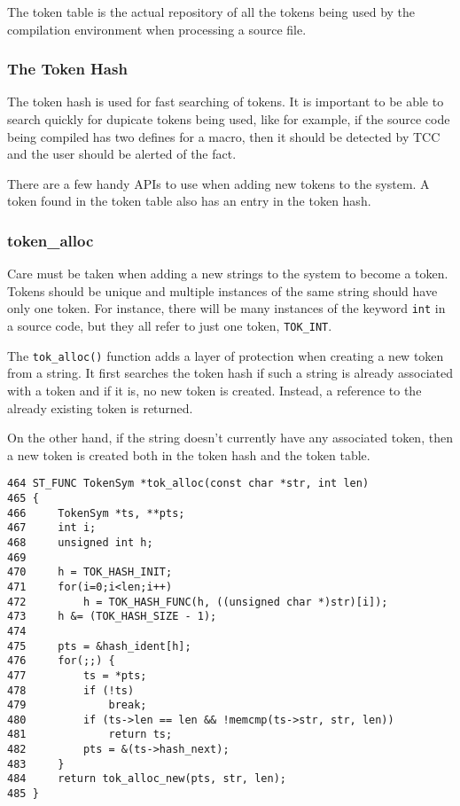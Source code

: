 The token table is the actual repository of all the tokens being used by the compilation environment when processing a source file.

\subsubsection{The Token Hash}

The token hash is used for fast searching of tokens. It is important to be able to search quickly for dupicate tokens being used, like for example, if the source code being compiled has two defines for a macro, then it should be detected by TCC and the user should be alerted of the fact.

There are a few handy APIs to use when adding new tokens to the system. A token found in the token table also has an entry in the token hash.

\subsubsection{token\_alloc}

Care must be taken when adding a new strings to the system to become a token. Tokens should be unique and multiple instances of the same string should have only one token. For instance, there will be many instances of the keyword \verb|int| in a source code, but they all refer to just one token, \verb|TOK_INT|.

The \verb|tok_alloc()| function adds a layer of protection when creating a new token from a string. It first searches the token hash if such a string is already associated with a token and if it is, no new token is created. Instead, a reference to the already existing token is returned.

On the other hand, if the string doesn't currently have any associated token, then a new token is created both in the token hash and the token table.

\begin{verbatim}
464 ST_FUNC TokenSym *tok_alloc(const char *str, int len)
465 {
466     TokenSym *ts, **pts;
467     int i;
468     unsigned int h;
469     
470     h = TOK_HASH_INIT;
471     for(i=0;i<len;i++)
472         h = TOK_HASH_FUNC(h, ((unsigned char *)str)[i]);
473     h &= (TOK_HASH_SIZE - 1);
474 
475     pts = &hash_ident[h];
476     for(;;) {
477         ts = *pts;
478         if (!ts)
479             break;
480         if (ts->len == len && !memcmp(ts->str, str, len))
481             return ts;
482         pts = &(ts->hash_next);
483     }
484     return tok_alloc_new(pts, str, len);
485 }
\end{verbatim}

